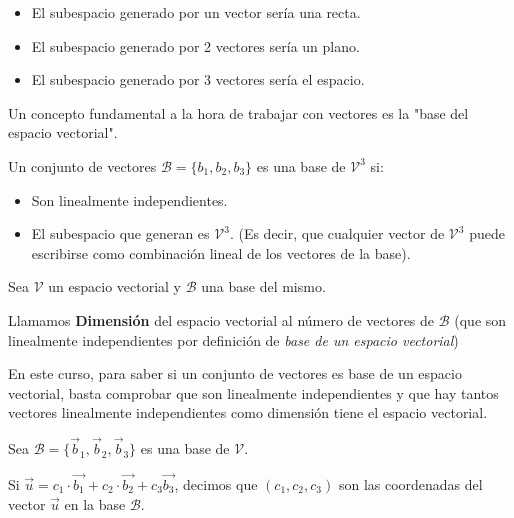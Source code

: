 \begin{example}
\begin{itemize}
  \item El subespacio generado por un vector sería una recta.
  \item El subespacio generado por 2 vectores sería un plano.
  \item El subespacio generado por 3 vectores sería el espacio.
\end{itemize}
\end{example}

Un concepto fundamental a la hora de trabajar con vectores es la "base del espacio vectorial". 

\begin{defn}
Un conjunto de vectores $\mathcal{B} = \{b_1,b_2,b_3\}$ es una base de $\mathcal{V}^3$ si:
  \begin{itemize}
      \item Son linealmente independientes.
      \item El subespacio que generan es $\mathcal{V}^3$. (Es decir, que cualquier vector de $\mathcal{V}^3$ puede escribirse como combinación lineal de los vectores de la base).
  \end{itemize}
\end{defn}


\begin{defn}
Sea $\mathcal{V}$ un espacio vectorial y $\mathcal{B}$ una base del mismo.

Llamamos \textbf{Dimensión} del espacio vectorial al número de vectores de $\mathcal{B}$ (que son linealmente independientes por definición de \textit{base de un espacio vectorial})
\end{defn}

En este curso, para saber si un conjunto de vectores es base de un espacio vectorial, basta comprobar que son linealmente independientes y que hay tantos vectores linealmente independientes como dimensión tiene el espacio vectorial.


\begin{defn}
Sea $\mathcal{B} = \{\vec{b}_1,\vec{b}_2,\vec{b}_3\}$ es una base de $\mathcal{V}$.

Si $\vec{u} = c_1 · \vec{b_1} +  c_2·\vec{b_2} + c_3\vec{b_3}$, decimos que $(c_1,c_2,c_3)$ son las coordenadas del vector $\vec{u}$ en la base $\mathcal{B}$.
\end{defn}

